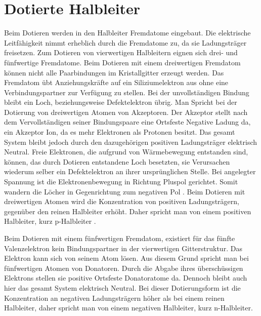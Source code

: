 \section{Dotierte Halbleiter}
Beim Dotieren werden in den Halbleiter Fremdatome eingebaut. Die elektrische Leitfähigkeit nimmt erheblich durch die Fremdatome zu, da sie Ladungsträger freisetzen. Zum Dotieren von vierwertigen Halbleitern eignen sich drei- und fünfwertige Fremdatome.
Beim Dotieren mit einem dreiwertigen Fremdatom können nicht alle Paarbindungen im Kristallgitter erzeugt werden. Das Fremdatom übt Anziehungskräfte auf ein Siliziumelektron aus ohne eine Verbindungspartner zur Verfügung zu stellen. Bei der unvollständigen Bindung bleibt ein Loch, beziehungsweise Defektelektron übrig. Man Spricht bei der Dotierung von dreiwertigen Atomen von Akzeptoren. Der Akzeptor stellt nach dem Vervollständigen seiner Bindungspaare eine Ortsfeste Negative Ladung da, ein Akzeptor Ion, da es mehr Elektronen als Protonen besitzt. Das gesamt System bleibt jedoch durch den dazugehörigen positiven Ladungsträger elektrisch Neutral. Freie Elektronen, die aufgrund von Wärmebewegung entstanden sind, können, das durch Dotieren entstandene Loch besetzten, sie Verursachen wiederum selber ein Defektelektron an ihrer ursprünglichen Stelle. Bei angelegter Spannung ist die Elektronenbewegung in Richtung Pluspol gerichtet. Somit wandern die Löcher in Gegenrichtung zum negativen Pol \cite{Fischer2016}.  Beim Dotieren mit dreiwertigen Atomen wird die Konzentration von positiven Ladungsträgern, gegenüber den reinen Halbleiter erhöht. Daher spricht man von einem positiven Halbleiter, kurz p-Halbleiter \cite{Stiny2018}.

Beim Dotieren mit einem fünfwertigen Fremdatom, existiert für das fünfte Valenzelektron kein Bindungspartner in der vierwertigen Gitterstruktur. Das Elektron kann sich von seinem Atom lösen. Aus diesem Grund spricht man bei fünfwertigen Atomen von Donatoren. Durch die Abgabe ihres überschüssigen Elektrons stellen sie positive Ortsfeste Donatoratome da. Dennoch bleibt auch hier das gesamt System elektrisch Neutral. Bei dieser Dotierungsform ist die Konzentration an negativen Ladungsträgern höher als bei einem reinen Halbleiter, daher spricht man von einem negativen Halbleiter, kurz n-Halbleiter.


